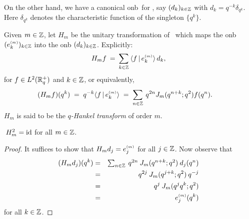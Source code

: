 On the other hand, we have a canonical {\sc onb}\ for \Ltwoq,
say $(d_k)_{k\in \ZZ}$ with $d_k = q^{-k} \delta_{q^k}$.
Here $\delta_{q^k}$ denotes the characteristic function of the singleton $\{q^k\}$.


\begin{defn} \label{def:qHankeltransform:unitary}
Given $m\in\ZZ$, let $H_m$ be the unitary transformation of \Ltwoq\
which maps the {\sc onb} $(\basis{m}{k})_{k\in \ZZ}$
into the {\sc onb} $(d_k)_{k\in \ZZ}$.
Explicitly:
$$ H_m f \:=\:\sum_{k\in \ZZ} \:\scal{f}{\basis{m}{k}}\,d_k , $$
for $f\in \Ltwoq$ and $k\in\ZZ$, or equivalently,
\begin{equation}\label{eq:qHankeltransform:def}
  (H_m f)(q^k) \;=\;  q^{-k} \scal{f}{\basis{m}{k}}
               \;=\;  \sum_{n\in \ZZ} \: q^{2n} \J{m}{q^{n+k}} f(q^n).
  \hspace{1em}
\end{equation}
$H_m$ is said to be the {\em $q$-Hankel transform\/} of order $m$.
\end{defn}



\begin{prop} \label{prop:qHankelSquare_is_id}
$\: H_m^2 = \id$ for all\/ $m\in\ZZ$.
\end{prop}
\begin{proof}
It suffices to show that $H_m d_j = \basis{m}{j}$ for all $j\in \ZZ$.
Now observe that
\begin{eqnarray*}
(H_m d_j)(q^k)
&=&
\textstyle \sum_{n\in \ZZ} \: q^{2n} \: \J{m}{q^{n+k}} \: d_j(q^n)
\\&=&
q^{2j} \: \J{m}{q^{j+k}} \: q^{-j}
\\&=&
q^j \: \J{m}{q^j q^k}
\\&=&
\basis{m}{j}(q^k)
\end{eqnarray*}
for all $k \in \ZZ$.
\end{proof}
